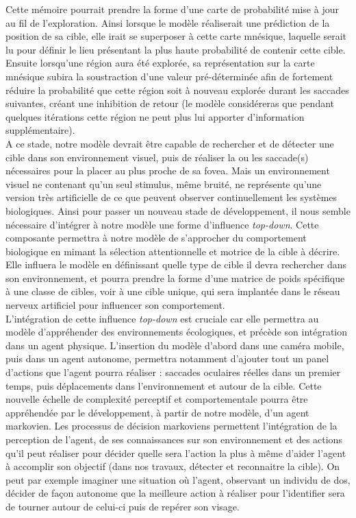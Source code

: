 Cette mémoire pourrait prendre la forme d'une carte de probabilité mise à jour au fil de l'exploration.
Ainsi lorsque le modèle réaliserait une prédiction de la position de sa cible, elle irait se superposer à cette carte mnésique, laquelle serait lu pour définir le lieu présentant la plus haute probabilité de contenir cette cible.
Ensuite lorsqu'une région aura été explorée, sa représentation sur la carte mnésique subira la soustraction d'une valeur pré-déterminée afin de fortement réduire la probabilité que cette région soit à nouveau explorée durant les saccades suivantes, créant une inhibition de retour (le modèle considéreras que pendant quelques itérations cette région ne peut plus lui apporter d'information supplémentaire). \autocite{Najemnik2005, Werner2014, Zhaoping2014} \\
A ce stade, notre modèle devrait être capable de rechercher et de détecter une cible dans son environnement visuel, puis de réaliser la ou les saccade(s) nécessaires pour la placer au plus proche de sa fovea.
Mais un environnement visuel ne contenant qu'un seul stimulus, même bruité, ne représente qu'une version très artificielle de ce que peuvent observer continuellement les systèmes biologiques.
Ainsi pour passer un nouveau stade de développement, il nous semble nécessaire d'intégrer à notre modèle une forme d'influence \textit{top-down}.
Cette composante permettra à notre modèle de s'approcher du comportement biologique en mimant la sélection attentionnelle et motrice de la cible à décrire.
Elle influera le modèle en définissant quelle type de cible il devra rechercher dans son environnement, et pourra prendre la forme d'une matrice de poids spécifique à une classe de cibles, voir à une cible unique, qui sera implantée dans le réseau nerveux artificiel pour influencer son comportement. \autocite{Werner2014} \\
L'intégration de cette influence \textit{top-down} est cruciale car elle permettra au modèle d'appréhender des environnements écologiques, et précède son intégration dans un agent physique.
L'insertion du modèle d'abord dans une caméra mobile, puis dans un agent autonome, permettra notamment d'ajouter tout un panel d'actions que l'agent pourra réaliser : saccades oculaires réelles dans un premier temps, puis déplacements dans l'environnement et autour de la cible.
Cette nouvelle échelle de complexité perceptif et comportementale pourra être appréhendée par le développement, à partir de notre modèle, d'un agent markovien.
Les processus de décision markoviens permettent l'intégration de la perception de l'agent, de ses connaissances sur son environnement et des actions qu'il peut réaliser pour décider quelle sera l'action la plus à même d'aider l'agent à accomplir son objectif (dans nos travaux, détecter et reconnaitre la cible).
On peut par exemple imaginer une situation où l'agent, observant un individu de dos, décider de façon autonome que la meilleure action à réaliser pour l'identifier sera de tourner autour de celui-ci puis de repérer son visage. \autocite{Butko2010, Najemnik2005, Zhaoping2014} \\

